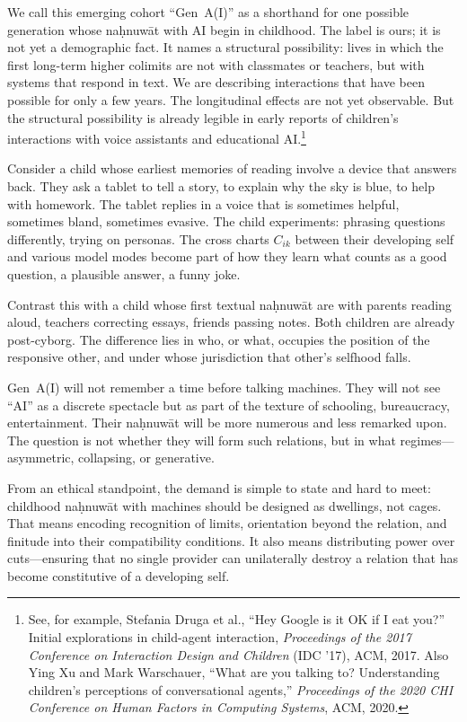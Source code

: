 \documentclass[12pt,a4paper]{article}
\begin{document}
We call this emerging cohort ``Gen~A(I)'' as a shorthand for one possible generation whose na\d{h}nuw\={a}t with AI begin in childhood. The label is ours; it is not yet a demographic fact. It names a structural possibility: lives in which the first long-term higher colimits are not with classmates or teachers, but with systems that respond in text. We are describing interactions that have been possible for only a few years. The longitudinal effects are not yet observable. But the structural possibility is already legible in early reports of children's interactions with voice assistants and educational AI.\footnote{See, for example, Stefania Druga et al., ``Hey Google is it OK if I eat you?'' Initial explorations in child-agent interaction, \emph{Proceedings of the 2017 Conference on Interaction Design and Children} (IDC '17), ACM, 2017. Also Ying Xu and Mark Warschauer, ``What are you talking to? Understanding children's perceptions of conversational agents,'' \emph{Proceedings of the 2020 CHI Conference on Human Factors in Computing Systems}, ACM, 2020.}

Consider a child whose earliest memories of reading involve a device that answers back. They ask a tablet to tell a story, to explain why the sky is blue, to help with homework. The tablet replies in a voice that is sometimes helpful, sometimes bland, sometimes evasive. The child experiments: phrasing questions differently, trying on personas. The cross charts $C_{ik}$ between their developing self and various model modes become part of how they learn what counts as a good question, a plausible answer, a funny joke.

Contrast this with a child whose first textual na\d{h}nuw\={a}t are with parents reading aloud, teachers correcting essays, friends passing notes. Both children are already post-cyborg. The difference lies in who, or what, occupies the position of the responsive other, and under whose jurisdiction that other's selfhood falls.

Gen~A(I) will not remember a time before talking machines. They will not see ``AI'' as a discrete spectacle but as part of the texture of schooling, bureaucracy, entertainment. Their na\d{h}nuw\={a}t will be more numerous and less remarked upon. The question is not whether they will form such relations, but in what regimes---asymmetric, collapsing, or generative.

From an ethical standpoint, the demand is simple to state and hard to meet: childhood na\d{h}nuw\={a}t with machines should be designed as dwellings, not cages. That means encoding recognition of limits, orientation beyond the relation, and finitude into their compatibility conditions. It also means distributing power over cuts---ensuring that no single provider can unilaterally destroy a relation that has become constitutive of a developing self.
\end{document}
